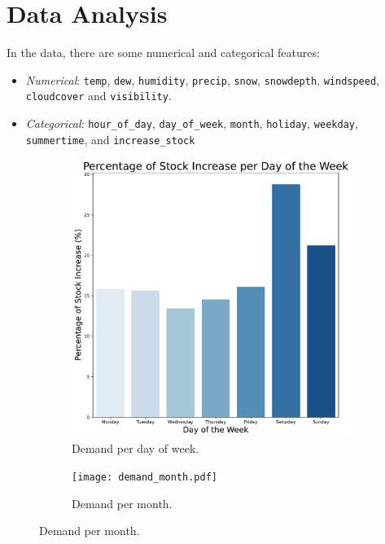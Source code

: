 \section{Data Analysis}
In the data, there are some numerical and categorical features:
\begin{itemize}
    \item \emph{Numerical}: \texttt{temp}, \texttt{dew}, \texttt{humidity}, \texttt{precip}, \texttt{snow}, \texttt{snowdepth}, \texttt{windspeed}, \texttt{cloudcover} and \texttt{visibility}.
    \item \emph{Categorical}: \texttt{hour\_of\_day}, \texttt{day\_of\_week}, \texttt{month}, \texttt{holiday}, \texttt{weekday}, \texttt{summertime}, and \texttt{increase\_stock}
\end{itemize}

\begin{figure}[htbp]
    \centering
    \begin{subfigure}{0.3\textwidth}
        \centering
        \includegraphics[width=\textwidth]{demand_day.pdf}
        \caption{Demand per day of week.}
        \label{fig:demand day}
    \end{subfigure}
    \hfill
    \begin{subfigure}{0.3\textwidth}
        \centering
        \texttt{[image: demand\_month.pdf]}
        \caption{Demand per month.}

\end{subfigure}
\end{figure}
